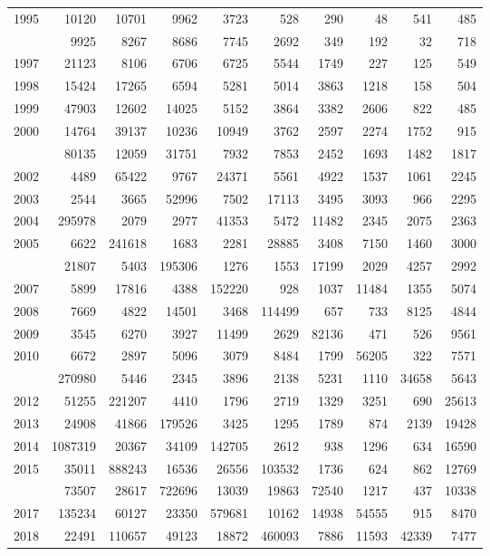 \documentclass[
]{article}
\begin{document}
\begin{longtable}[t]{lrrrrrrrrr}
1995 & 10120 & 10701 & 9962 & 3723 & 528 & 290 & 48 & 541 & 485\\
\addlinespace
1996 & 9925 & 8267 & 8686 & 7745 & 2692 & 349 & 192 & 32 & 718\\
1997 & 21123 & 8106 & 6706 & 6725 & 5544 & 1749 & 227 & 125 & 549\\
1998 & 15424 & 17265 & 6594 & 5281 & 5014 & 3863 & 1218 & 158 & 504\\
1999 & 47903 & 12602 & 14025 & 5152 & 3864 & 3382 & 2606 & 822 & 485\\
2000 & 14764 & 39137 & 10236 & 10949 & 3762 & 2597 & 2274 & 1752 & 915\\
\addlinespace
2001 & 80135 & 12059 & 31751 & 7932 & 7853 & 2452 & 1693 & 1482 & 1817\\
2002 & 4489 & 65422 & 9767 & 24371 & 5561 & 4922 & 1537 & 1061 & 2245\\
2003 & 2544 & 3665 & 52996 & 7502 & 17113 & 3495 & 3093 & 966 & 2295\\
2004 & 295978 & 2079 & 2977 & 41353 & 5472 & 11482 & 2345 & 2075 & 2363\\
2005 & 6622 & 241618 & 1683 & 2281 & 28885 & 3408 & 7150 & 1460 & 3000\\
\addlinespace
2006 & 21807 & 5403 & 195306 & 1276 & 1553 & 17199 & 2029 & 4257 & 2992\\
2007 & 5899 & 17816 & 4388 & 152220 & 928 & 1037 & 11484 & 1355 & 5074\\
2008 & 7669 & 4822 & 14501 & 3468 & 114499 & 657 & 733 & 8125 & 4844\\
2009 & 3545 & 6270 & 3927 & 11499 & 2629 & 82136 & 471 & 526 & 9561\\
2010 & 6672 & 2897 & 5096 & 3079 & 8484 & 1799 & 56205 & 322 & 7571\\
\addlinespace
2011 & 270980 & 5446 & 2345 & 3896 & 2138 & 5231 & 1110 & 34658 & 5643\\
2012 & 51255 & 221207 & 4410 & 1796 & 2719 & 1329 & 3251 & 690 & 25613\\
2013 & 24908 & 41866 & 179526 & 3425 & 1295 & 1789 & 874 & 2139 & 19428\\
2014 & 1087319 & 20367 & 34109 & 142705 & 2612 & 938 & 1296 & 634 & 16590\\
2015 & 35011 & 888243 & 16536 & 26556 & 103532 & 1736 & 624 & 862 & 12769\\
\addlinespace
2016 & 73507 & 28617 & 722696 & 13039 & 19863 & 72540 & 1217 & 437 & 10338\\
2017 & 135234 & 60127 & 23350 & 579681 & 10162 & 14938 & 54555 & 915 & 8470\\
2018 & 22491 & 110657 & 49123 & 18872 & 460093 & 7886 & 11593 & 42339 & 7477\\*
\end{longtable}
\end{document}
